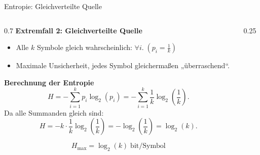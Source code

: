 \begin{frame}{Entropie: Gleichverteilte Quelle}
  \footnotesize
\begin{columns}
  \begin{column}{0.7\textwidth}
    \textbf{Extremfall 2: Gleichverteilte Quelle}
    \begin{itemize}
      \item Alle \(k\) Symbole gleich wahrscheinlich:             \(
              \forall i. \; (p_i = \frac{1}{k}) 
            \)
      \item Maximale Unsicherheit, jedes Symbol gleichermaßen „überraschend“.
    \end{itemize}

    \textbf{Berechnung der Entropie}
    \[
      H = - \sum_{i=1}^{k} p_i \log_2(p_i)
        = - \sum_{i=1}^{k} \frac{1}{k} \log_2\!\left(\frac{1}{k}\right).
    \]
    Da alle Summanden gleich sind:
    \[
      H = - k \cdot \frac{1}{k} \log_2\!\left(\frac{1}{k}\right)
        = - \log_2\!\left(\frac{1}{k}\right)
        = \log_2(k).
    \]

    \[
      \boxed{H_{\max} = \log_2(k) \;\text{bit/Symbol}}
    \]
  \end{column}

  \begin{column}{0.25\textwidth}
    \centering
  \end{column}
\end{columns}
\end{frame}


